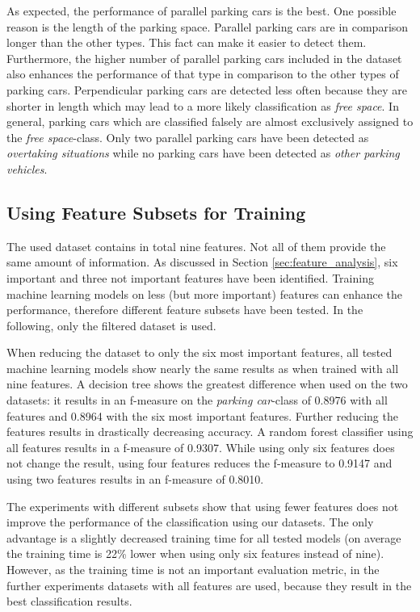 As expected, the performance of parallel parking cars is the best. One possible reason is the length of the parking space. Parallel parking cars are in comparison longer than the other types. This fact can make it easier to detect them. Furthermore, the higher number of parallel parking cars included in the dataset also enhances the performance of that type in comparison to the other types of parking cars. Perpendicular parking cars are detected less often because they are shorter in length which may lead to a more likely classification as \emph{free space}. In general, parking cars which are classified falsely are almost exclusively assigned to the \emph{free space}-class. Only two parallel parking cars have been detected as \emph{overtaking situations} while no parking cars have been detected as \emph{other parking vehicles}.




\subsection{Using Feature Subsets for Training}

The used dataset contains in total nine features. Not all of them provide the same amount of information. As discussed in Section \ref{sec:feature_analysis}, six important and three not important features have been identified. Training machine learning models on less (but more important) features can enhance the performance, therefore different feature subsets have been tested. In the following, only the filtered dataset is used.

When reducing the dataset to only the six most important features, all tested machine learning models show nearly the same results as when trained with all nine features. A decision tree shows the greatest difference when used on the two datasets: it results in an f-measure on the \emph{parking car}-class of 0.8976 with all features and 0.8964 with the six most important features. Further reducing the features results in drastically decreasing accuracy. A random forest classifier using all features results in a f-measure of 0.9307. While using only six features does not change the result, using four features reduces the f-measure to 0.9147 and using two features results in an f-measure of 0.8010.

The experiments with different subsets show that using fewer features does not improve the performance of the classification using our datasets. The only advantage is a slightly decreased training time for all tested models (on average the training time is 22\% lower when using only six features instead of nine). However, as the training time is not an important evaluation metric, in the further experiments datasets with all features are used, because they result in the best classification results.



